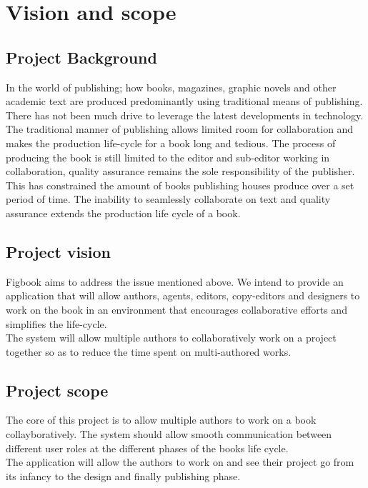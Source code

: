 \documentclass[12pt]{article}
\begin{document}


\newpage
\tableofcontents

\newpage
\listoffigures

\newpage

\section{Vision and scope}

\subsection{Project Background}
In the world of publishing; how books, magazines, graphic novels and other academic text are produced
predominantly using traditional means of publishing. There has not been much drive to leverage the
latest developments in technology.\\
The traditional manner of publishing allows limited room for collaboration and makes the production
life-cycle for a book long and tedious. The process of producing the book is still limited to the
editor and sub-editor working in collaboration, quality assurance remains the sole responsibility of the
publisher.\\
This has constrained the amount of books publishing houses produce over a set period of time. The
inability to seamlessly collaborate on text and quality assurance extends the production life cycle of a
book.
\subsection{Project vision}
Figbook aims to address the issue mentioned above. We intend to provide an application that will allow authors, agents, editors, copy-editors and designers to work on the book in an environment that encourages collaborative efforts and simplifies the life-cycle.\\
The system will allow multiple authors to collaboratively work on a project together so as to reduce the time spent on multi-authored works.\\
 
\subsection{Project scope}
The core of this project is to allow multiple authors to work on a book collayboratively. The system should allow smooth communication between different user roles at the different phases of the books life cycle.\\
The application will allow the authors to work on and see their project go from its infancy to the design and finally publishing phase.
\newpage
\end{document}
